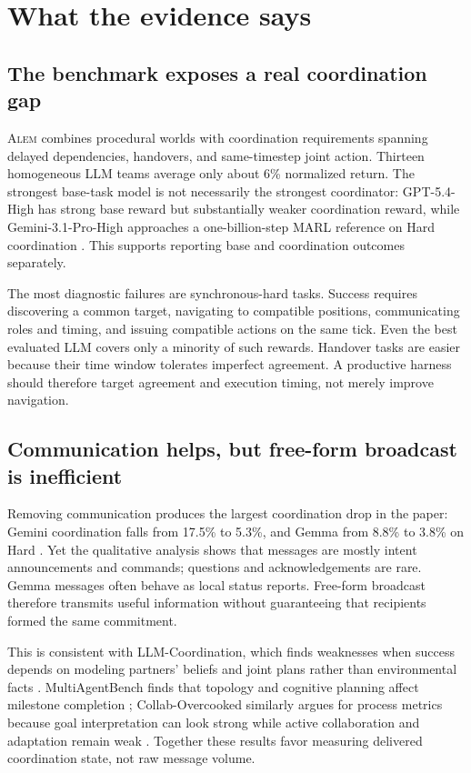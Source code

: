 \documentclass[11pt]{article}
\newcommand{\alem}{\textsc{Alem}}
\begin{document}
\section{What the evidence says}

\subsection{The benchmark exposes a real coordination gap}

\alem{} combines procedural worlds with coordination requirements spanning delayed dependencies,
handovers, and same-timestep joint action.  Thirteen homogeneous LLM teams average only about 6\%
normalized return.  The strongest base-task model is not necessarily the strongest coordinator:
GPT-5.4-High has strong base reward but substantially weaker coordination reward, while
Gemini-3.1-Pro-High approaches a one-billion-step MARL reference on Hard coordination
\cite{alem2026}.  This supports reporting base and coordination outcomes separately.

The most diagnostic failures are synchronous-hard tasks.  Success requires discovering a common
target, navigating to compatible positions, communicating roles and timing, and issuing compatible
actions on the same tick.  Even the best evaluated LLM covers only a minority of such rewards.
Handover tasks are easier because their time window tolerates imperfect agreement.  A productive
harness should therefore target agreement and execution timing, not merely improve navigation.

\subsection{Communication helps, but free-form broadcast is inefficient}

Removing communication produces the largest coordination drop in the paper: Gemini coordination
falls from 17.5\% to 5.3\%, and Gemma from 8.8\% to 3.8\% on Hard \cite{alem2026}.  Yet the
qualitative analysis shows that messages are mostly intent announcements and commands; questions
and acknowledgements are rare.  Gemma messages often behave as local status reports.  Free-form
broadcast therefore transmits useful information without guaranteeing that recipients formed the
same commitment.

This is consistent with LLM-Coordination, which finds weaknesses when success depends on modeling
partners' beliefs and joint plans rather than environmental facts \cite{agashe2025coordination}.
MultiAgentBench finds that topology and cognitive planning affect milestone completion
\cite{zhu2025multiagentbench}; Collab-Overcooked similarly argues for process metrics because goal
interpretation can look strong while active collaboration and adaptation remain weak
\cite{sun2025collab}.  Together these results favor measuring delivered coordination state, not raw
message volume.
\end{document}

